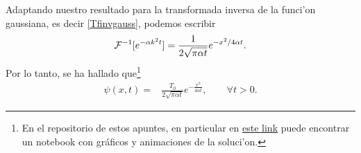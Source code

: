 Adaptando nuestro resultado para la transformada inversa de la funci'on gaussiana, es decir \eqref{Tfinvgauss}, podemos escribir
\begin{align}
{\cal F}^{-1}[e^{-\alpha k^2 t}] = \frac{1}{2\sqrt{\pi\alpha t}}e^{-x^2/4\alpha t}.
\end{align}
Por lo tanto, se ha hallado que\footnote{En el repositorio de estos apuntes, en particular en \href{https://github.com/gfrubi/FM2/blob/master/Notebooks/Ejemplo-Difusion-Calor-1D.ipynb}{este link} puede encontrar un notebook con gráficos y animaciones de la soluci'on.}
\begin{align}
\psi(x,t)=&\frac{T_{0}}{2\sqrt{\pi \alpha t}}e^{-\frac{x^2}{4 \alpha t}},\qquad \forall t>0.
\end{align}
